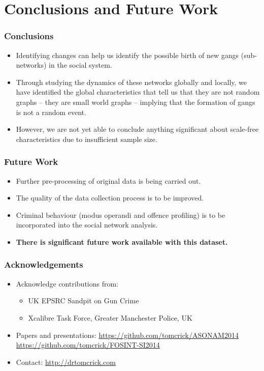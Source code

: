 \documentclass[pdftex]{beamer}
\begin{document}
\section{Conclusions and Future Work}

\begin{frame}
\frametitle{Conclusions}
\begin{itemize}
\item Identifying changes can help us identify the possible birth of
  new gangs (sub-networks) in the social system.
\item Through studying the dynamics of these networks globally and
  locally, we have identified the global characteristics that tell us
  that they are not random graphs -- they are small world graphs -- 
  implying that the formation of gangs is not a random event. 
\item However, we are not yet able to conclude anything significant
  about scale-free characteristics due to insufficient sample size.
\end{itemize}
\end{frame}

\begin{frame}
\frametitle{Future Work}
\begin{itemize}
\item Further pre-processing of original data is being carried out.
\item The quality of the data collection process is to be improved.
\item Criminal behaviour (modus operandi and offence profiling) is to
be incorporated into the social network analysis.
\item {\textbf{There is significant future work available with this dataset.}}
\end{itemize}
\end{frame}

\begin{frame}
\frametitle{Acknowledgements}
\begin{itemize}
\item Acknowledge contributions from:
\begin{itemize}
\item UK EPSRC Sandpit on Gun Crime
\item Xcalibre Task Force, Greater Manchester Police, UK\newline
\end{itemize}
\item Papers and presentations:
  \url{https://github.com/tomcrick/ASONAM2014}\\
\url{https://github.com/tomcrick/FOSINT-SI2014}\newline
\item Contact: \url{http://drtomcrick.com}
\end{itemize}
\end{frame}
\end{document}
